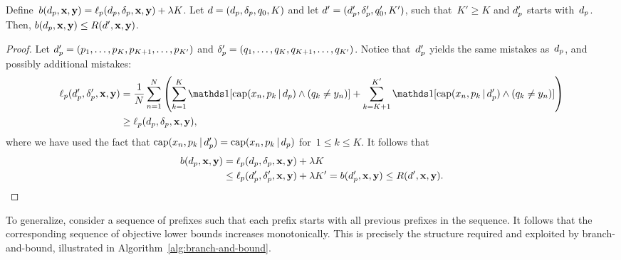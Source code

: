 \begin{theorem}
Define~${b(d_p, \mathbf{x}, \mathbf{y}) = \ell_p(d_p, \delta_p, \mathbf{x}, \mathbf{y}) + {\lambda} K}$.
%
Let ${{d} = (d_p, \delta_p, q_0, K)}$
and let ${{d}' = (d_p', \delta_p', q_0', K')}$,
such that~${K' \ge K}$ and $d_p'$ starts with~$d_p$.
%
Then, ${b(d_p, \mathbf{x}, \mathbf{y}) \le R({d}', \mathbf{x}, \mathbf{y})}$.
\label{thm:bound}
\end{theorem}

\begin{proof}
Let ${d_p' = (p_1, \dots, p_K, p_{K+1}, \dots, p_{K'})}$
and ${\delta_p' = (q_1, \dots, q_K, q_{K+1}, \dots, q_{K'})}$.
%
Notice that~$d_p'$ yields the same mistakes as~$d_p$,
and possibly additional mistakes:
\begin{align}
\Loss_p(\Prefix', \Labels', \x, \y)
&= \frac{1}{N} \sum_{n=1}^N \left( \sum_{k=1}^K \one [ \Cap(x_n, p_k \given \Prefix) \wedge (q_k \neq y_n) ]
+ \sum_{k=K+1}^{K'} \one [ \Cap(x_n, p_k \given \Prefix') \wedge (q_k \neq y_n) ] \right) \nn \\
&\ge \Loss_p(\Prefix, \Labels, \x, \y),
\label{eq:prefix-loss}
\end{align}
where we have used the fact that
${\textnormal{cap}(x_n, p_k \,|\, d_p') = \textnormal{cap}(x_n, p_k \,|\, d_p)}$
for~${1 \le k \le K}$.
%
It follows that
\begin{align}
b(\Prefix, \x, \y) &= \Loss_p(\Prefix, \Labels, \x, \y) + \Reg K \nn \\
&\le  \Loss_p(\Prefix', \Labels', \x, \y) + \Reg K' = b(\Prefix', \x, \y)
\le \Obj(\RL', \x, \y).
\label{eq:prefix-lb}
\end{align}
\end{proof}

To generalize, consider a sequence of prefixes such that each prefix
starts with all previous prefixes in the sequence.
%
It follows that the corresponding sequence of objective lower bounds
increases monotonically.
%
This is precisely the structure required and exploited by branch-and-bound,
illustrated in Algorithm~\ref{alg:branch-and-bound}.

